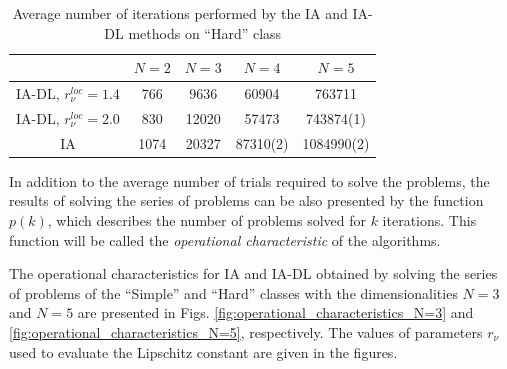 \documentclass[review]{elsarticle}
\begin{document}
\begin{table}[h!]
	\centering
		\begin{tabular}{ccccc}
			\hline
			& $N=2$ & $N=3$ & $N=4$ & $N=5$ \\
			\hline
			IA-DL, $r_{\nu}^{loc}=1.4$ & 766 & 9636 & 60904 & 763711 \\
			\hline
			IA-DL, $r_{\nu}^{loc}=2.0$ & 830 & 12020 & 57473 & 743874(1) \\
			\hline
			IA & 1074 & 20327 & 87310(2) & 1084990(2) \\
			\hline
		\end{tabular}
	\caption{Average number of iterations performed by the IA and IA-DL methods on “Hard” class}
	\label{tab:average_number_of_iterations_hard}
\end{table}

	In addition to the average number of trials required to solve the problems, the results of solving the series of problems can be also presented by the function $p(k)$, which describes the number of problems solved for $k$ iterations. This function will be called the \textit{operational characteristic} of the algorithms.
	
	The operational characteristics for IA and IA-DL obtained by solving the series of problems of the “Simple” and “Hard” classes with the dimensionalities $N=3$ and $N=5$ are presented in Figs. \ref{fig:operational_characteristics_N=3} and \ref{fig:operational_characteristics_N=5}, respectively. The values of parameters $r_{\nu}$ used to evaluate the Lipschitz constant are given in the figures.
\end{document}
